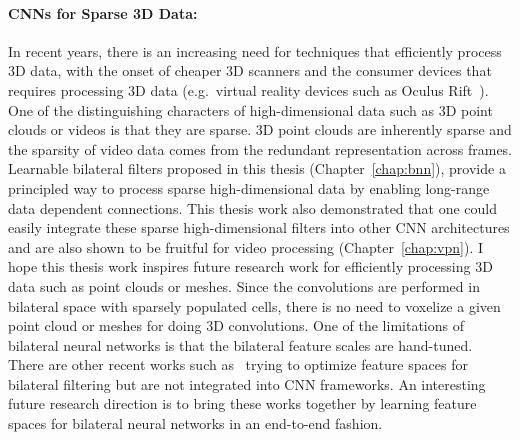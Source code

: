 \paragraph{CNNs for Sparse 3D Data:}
In recent years, there is an increasing need for techniques that efficiently
process 3D data, with the onset of cheaper 3D scanners and the consumer devices
that requires processing 3D data (e.g.~virtual reality devices such as Oculus Rift~\cite{oculus}).
One of the distinguishing characters of high-dimensional data such as 3D point clouds
or videos is that they are sparse. 3D point clouds are inherently sparse and the sparsity
of video data comes from the redundant representation across frames.
Learnable bilateral filters proposed in this thesis
(Chapter~\ref{chap:bnn}), provide a principled way to process sparse high-dimensional
data by enabling long-range data dependent connections. This thesis work also demonstrated
that one could easily integrate these sparse high-dimensional filters into other
CNN architectures and are also shown to be fruitful for video processing (Chapter~\ref{chap:vpn}).
I hope this thesis work inspires future research work for efficiently processing
3D data such as point clouds or meshes. Since the convolutions are performed in
bilateral space with sparsely populated cells, there is no need to voxelize a given
point cloud or meshes for doing 3D convolutions.
One of the limitations of bilateral neural networks
is that the bilateral feature scales are hand-­tuned.
There are other recent works such as~\cite{krahenbuhl2013parameter,kundu2016feature}
trying to optimize feature spaces for bilateral filtering but are not integrated into CNN frameworks.
An interesting future research direction is to bring these works together by learning feature spaces
for bilateral neural networks in an end-­to-­end fashion.

\vspace{-0.2cm}
